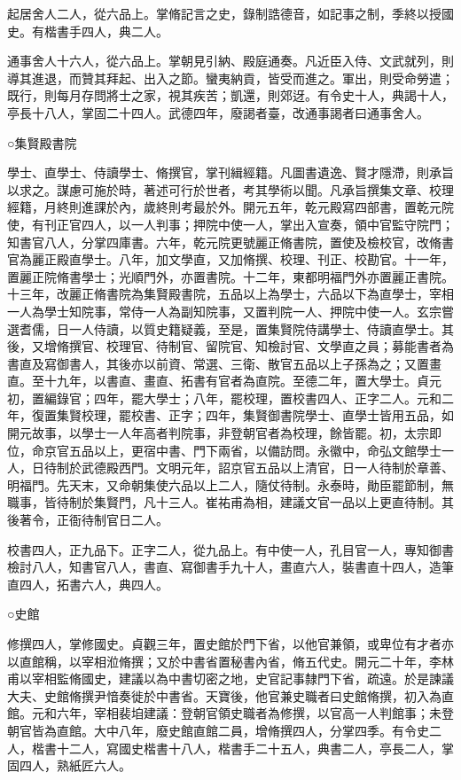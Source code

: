 \begin{pinyinscope}
 起居舍人二人，從六品上。掌脩記言之史，錄制誥德音，如記事之制，季終以授國史。有楷書手四人，典二人。



 通事舍人十六人，從六品上。掌朝見引納、殿庭通奏。凡近臣入侍、文武就列，則導其進退，而贊其拜起、出入之節。蠻夷納貢，皆受而進之。軍出，則受命勞遣；既行，則每月存問將士之家，視其疾苦；凱還，則郊迓。有令史十人，典謁十人，亭長十八人，掌固二十四人。武德四年，廢謁者臺，改通事謁者曰通事舍人。



 ○集賢殿書院



 學士、直學士、侍讀學士、脩撰官，掌刊緝經籍。凡圖書遺逸、賢才隱滯，則承旨以求之。謀慮可施於時，著述可行於世者，考其學術以聞。凡承旨撰集文章、校理經籍，月終則進課於內，歲終則考最於外。開元五年，乾元殿寫四部書，置乾元院使，有刊正官四人，以一人判事；押院中使一人，掌出入宣奏，領中官監守院門；知書官八人，分掌四庫書。六年，乾元院更號麗正脩書院，置使及檢校官，改脩書官為麗正殿直學士。八年，加文學直，又加脩撰、校理、刊正、校勘官。十一年，置麗正院脩書學士；光順門外，亦置書院。十二年，東都明福門外亦置麗正書院。十三年，改麗正脩書院為集賢殿書院，五品以上為學士，六品以下為直學士，宰相一人為學士知院事，常侍一人為副知院事，又置判院一人、押院中使一人。玄宗嘗選耆儒，日一人侍讀，以質史籍疑義，至是，置集賢院侍講學士、侍讀直學士。其後，又增脩撰官、校理官、待制官、留院官、知檢討官、文學直之員；募能書者為書直及寫御書人，其後亦以前資、常選、三衛、散官五品以上子孫為之；又置畫直。至十九年，以書直、畫直、拓書有官者為直院。至德二年，置大學士。貞元初，置編錄官；四年，罷大學士；八年，罷校理，置校書四人、正字二人。元和二年，復置集賢校理，罷校書、正字；四年，集賢御書院學士、直學士皆用五品，如開元故事，以學士一人年高者判院事，非登朝官者為校理，餘皆罷。初，太宗即位，命京官五品以上，更宿中書、門下兩省，以備訪問。永徽中，命弘文館學士一人，日待制於武德殿西門。文明元年，詔京官五品以上清官，日一人待制於章善、明福門。先天末，又命朝集使六品以上二人，隨仗待制。永泰時，勛臣罷節制，無職事，皆待制於集賢門，凡十三人。崔祐甫為相，建議文官一品以上更直待制。其後著令，正衙待制官日二人。



 校書四人，正九品下。正字二人，從九品上。有中使一人，孔目官一人，專知御書檢討八人，知書官八人，書直、寫御書手九十人，畫直六人，裝書直十四人，造筆直四人，拓書六人，典四人。



 ○史館



 修撰四人，掌修國史。貞觀三年，置史館於門下省，以他官兼領，或卑位有才者亦以直館稱，以宰相涖脩撰；又於中書省置秘書內省，脩五代史。開元二十年，李林甫以宰相監脩國史，建議以為中書切密之地，史官記事隸門下省，疏遠。於是諫議大夫、史館脩撰尹愔奏徙於中書省。天寶後，他官兼史職者曰史館脩撰，初入為直館。元和六年，宰相裴垍建議：登朝官領史職者為修撰，以官高一人判館事；未登朝官皆為直館。大中八年，廢史館直館二員，增脩撰四人，分掌四季。有令史二人，楷書十二人，寫國史楷書十八人，楷書手二十五人，典書二人，亭長二人，掌固四人，熟紙匠六人。




\end{pinyinscope}
